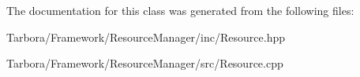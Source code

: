 The documentation for this class was generated from the following files\+:\begin{DoxyCompactItemize}
\item 
Tarbora/\+Framework/\+Resource\+Manager/inc/Resource.\+hpp\item 
Tarbora/\+Framework/\+Resource\+Manager/src/Resource.\+cpp\end{DoxyCompactItemize}
